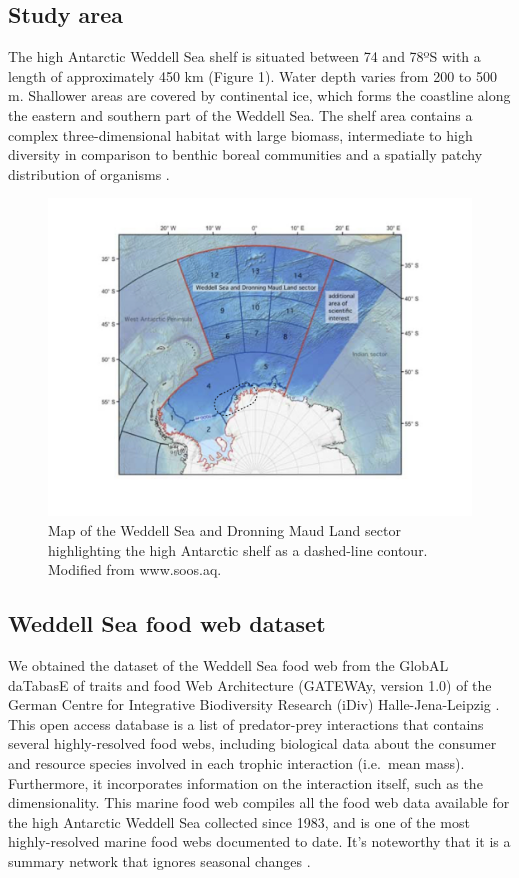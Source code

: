 \documentclass[gc, manuscript]{copernicus}
\begin{document}
\subsection{Study area}

The high Antarctic Weddell Sea shelf is situated between 74 and 78ºS
with a length of approximately 450 km (Figure 1). Water depth varies
from 200 to 500 m. Shallower areas are covered by continental ice, which
forms the coastline along the eastern and southern part of the Weddell
Sea. The shelf area contains a complex three-dimensional habitat with
large biomass, intermediate to high diversity in comparison to benthic
boreal communities and a spatially patchy distribution of organisms
\citep{Dayton1990, Teixido2002}.

\begin{figure}
\includegraphics[width=12cm]{WeddellSea_map} \caption{Map of the Weddell Sea and Dronning Maud Land sector highlighting the high Antarctic shelf as a dashed-line contour. Modified from www.soos.aq.}\label{fig:unnamed-chunk-1}
\end{figure}

\subsection{Weddell Sea food web dataset}

We obtained the dataset of the Weddell Sea food web from the GlobAL
daTabasE of traits and food Web Architecture (GATEWAy, version 1.0) of
the German Centre for Integrative Biodiversity Research (iDiv)
Halle-Jena-Leipzig \citep{Brose2018}. This open access database is a
list of predator-prey interactions that contains several highly-resolved
food webs, including biological data about the consumer and resource
species involved in each trophic interaction (i.e.~mean mass).
Furthermore, it incorporates information on the interaction itself, such
as the dimensionality. This marine food web compiles all the food web
data available for the high Antarctic Weddell Sea collected since 1983,
and is one of the most highly-resolved marine food webs documented to
date. It's noteworthy that it is a summary network that ignores seasonal
changes \citep{Jacob2011}.
\end{document}
